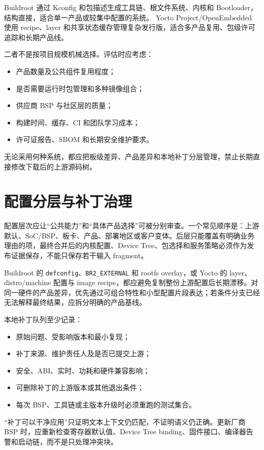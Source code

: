 Buildroot 通过 Kconfig 和包描述生成工具链、根文件系统、内核和 Bootloader，结构直接，适合单一产品或较集中配置的系统\cite{buildroot-manual}。
Yocto Project/OpenEmbedded 使用 recipe、layer 和共享状态缓存管理复杂发行版，适合多产品复用、包级许可追踪和长期产品线\cite{yocto-mega-manual}。

二者不是按项目规模机械选择。评估时应考虑：
\begin{itemize}
  \item 产品数量及公共组件复用程度；
  \item 是否需要运行时包管理和多种镜像组合；
  \item 供应商 BSP 与社区层的质量；
  \item 构建时间、缓存、CI 和团队学习成本；
  \item 许可证报告、SBOM 和长期安全维护要求。
\end{itemize}

无论采用何种系统，都应把板级差异、产品差异和本地补丁分层管理，禁止长期直接修改下载后的上游源码树。

\section{配置分层与补丁治理}

配置层次应让“公共能力”和“具体产品选择”可被分别审查。一个常见顺序是：上游默认、SoC/BSP、板卡、产品、部署地区或客户变体。后层只能覆盖有明确业务理由的项，最终合并后的内核配置、Device Tree、包选择和服务策略必须作为发布证据保存，不能只保存若干输入 fragment。

Buildroot 的 \texttt{defconfig}、\texttt{BR2\_EXTERNAL} 和 rootfs overlay，或 Yocto 的 layer、distro/machine 配置与 image recipe，都应避免复制整份上游配置后长期漂移。对同一硬件的产品差异，优先通过可组合特性和小型配置片段表达；若条件分支已经无法解释最终结果，应拆分明确的产品基线。

本地补丁队列至少记录：
\begin{itemize}
  \item 原始问题、受影响版本和最小复现；
  \item 补丁来源、维护责任人及是否已提交上游；
  \item 安全、ABI、实时、功耗和硬件兼容影响；
  \item 可删除补丁的上游版本或其他退出条件；
  \item 每次 BSP、工具链或主版本升级时必须重跑的测试集合。
\end{itemize}

“补丁可以干净应用”只证明文本上下文仍匹配，不证明语义仍正确。更新厂商 BSP 时，应重新检查寄存器默认值、Device Tree binding、固件接口、编译器告警和启动链，而不是只处理冲突块。

